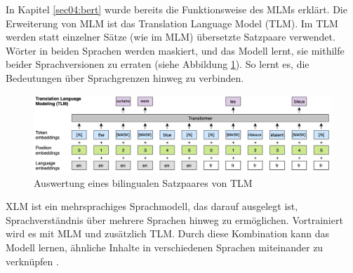 In Kapitel \ref{sec04:bert} wurde bereits die Funktionsweise des MLMs erklärt. Die Erweiterung von MLM ist das Translation Language Model (TLM).
Im TLM werden statt einzelner Sätze (wie im MLM) übersetzte Satzpaare verwendet. Wörter in beiden Sprachen werden maskiert, und das Modell lernt, 
sie mithilfe beider Sprachversionen zu erraten (siehe Abbildung \ref{fig:translation_language_modeling}). So lernt es, die Bedeutungen über Sprachgrenzen hinweg zu 
verbinden.

\begin{figure}[htbp]
    \begin{center}
    \includegraphics[scale=0.32]{static/translation_language_modeling.png}
    \caption{\label{fig:translation_language_modeling} Auswertung eines bilingualen Satzpaares von TLM \cite{NEURIPS2019_c04c19c2}}
    \end{center}
\end{figure}

XLM ist ein mehrsprachiges Sprachmodell, das darauf ausgelegt ist, Sprachverständnis über mehrere Sprachen hinweg zu ermöglichen.
Vortrainiert wird es mit MLM und zusätzlich TLM.
Durch diese Kombination kann das Modell lernen, ähnliche Inhalte in verschiedenen Sprachen miteinander zu verknüpfen \cite{NEURIPS2019_c04c19c2}.